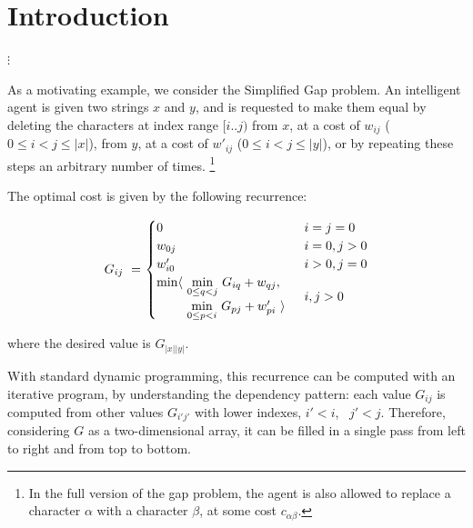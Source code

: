 \section{Introduction}
\label{intro}

\begin{center}$\vdots$\end{center}

As a motivating example, we consider the Simplified Gap problem.
An intelligent agent is given two strings $x$ and $y$, and is requested
to make them equal by deleting the characters at index range $[i..j)$
from $x$, at a cost of $w_{ij}$ ($0\leq i<j\leq |x|$), from $y$,
at a cost of $w'_{ij}$ ($0\leq i<j\leq |y|$), or by repeating these steps
an arbitrary number of times.
\footnote{In the full version of the gap problem, the agent is also allowed to replace a character $\alpha$ with a character $\beta$, at some cost $c_{\alpha\beta}$.}

The optimal cost is given by the following recurrence:

\begin{equation}
\renewcommand\arraystretch{1.5}
\begin{array}{l@{}l}
	G_{ij} ~=~  &
	\begin{cases}
		0                        & i=j=0 \\
		w_{0j}                   & i=0, j>0 \\
		w'_{i0}                  & i>0, j=0 \\
		\begin{array}{@{}l@{~}l}
		  \min\langle & \underset{0\leq q<j}\min ~ G_{iq} + w_{qj}, \\
		              & \underset{0\leq p<i}\min ~ G_{pj} + w'_{pi}~\rangle
		\end{array}              & i,j>0
	\end{cases}
\end{array}
\label{intro:gap spec}
\end{equation}

\smallskip\noindent
where the desired value is $G_{|x||y|}$.

\medskip
With standard dynamic programming, this recurrence can be computed
with an iterative program, by understanding the dependency pattern:
each value $G_{ij}$ is computed from other values $G_{i'j'}$ with lower
indexes, $i'<i$, ~$j'<j$. Therefore, considering $G$ as a two-dimensional
array, it can be filled in a single pass from left to right and from top
to bottom.

\newcommand\FORLINE[1]{\STATE\algorithmicfor~{#1} \algorithmicdo~}


